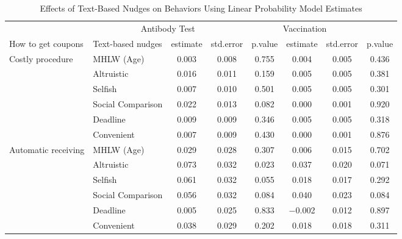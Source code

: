 \begin{table}

\caption{Effects of Text-Based Nudges on Behaviors Using Linear Probability Model Estimates \label{tab:act-reg-ftest}}
\centering
\begin{tabular}[t]{>{\raggedright\arraybackslash}p{5em}lcccccc}
\toprule
\multicolumn{2}{c}{ } & \multicolumn{3}{c}{Antibody Test} & \multicolumn{3}{c}{Vaccination} \\
\cmidrule(l{3pt}r{3pt}){3-5} \cmidrule(l{3pt}r{3pt}){6-8}
How to get coupons & Text-based nudges & estimate & std.error & p.value & estimate  & std.error  & p.value \\
\midrule
Costly procedure & MHLW (Age) & \num{0.003} & \num{0.008} & \num{0.755} & \num{0.004} & \num{0.005} & \num{0.436}\\
 & Altruistic & \num{0.016} & \num{0.011} & \num{0.159} & \num{0.005} & \num{0.005} & \num{0.381}\\
 & Selfish & \num{0.007} & \num{0.010} & \num{0.501} & \num{0.005} & \num{0.005} & \num{0.301}\\
 & Social Comparison & \num{0.022} & \num{0.013} & \num{0.082} & \num{0.000} & \num{0.001} & \num{0.920}\\
 & Deadline & \num{0.009} & \num{0.009} & \num{0.346} & \num{0.005} & \num{0.005} & \num{0.318}\\
 & Convenient & \num{0.007} & \num{0.009} & \num{0.430} & \num{0.000} & \num{0.001} & \num{0.876}\\
Automatic receiving & MHLW (Age) & \num{0.029} & \num{0.028} & \num{0.307} & \num{0.006} & \num{0.015} & \num{0.702}\\
 & Altruistic & \num{0.073} & \num{0.032} & \num{0.023} & \num{0.037} & \num{0.020} & \num{0.071}\\
 & Selfish & \num{0.061} & \num{0.032} & \num{0.055} & \num{0.018} & \num{0.017} & \num{0.292}\\
 & Social Comparison & \num{0.056} & \num{0.032} & \num{0.084} & \num{0.040} & \num{0.023} & \num{0.084}\\
 & Deadline & \num{0.005} & \num{0.025} & \num{0.833} & \num{-0.002} & \num{0.012} & \num{0.897}\\
 & Convenient & \num{0.038} & \num{0.029} & \num{0.202} & \num{0.018} & \num{0.018} & \num{0.311}\\
\bottomrule
\end{tabular}
\end{table}
